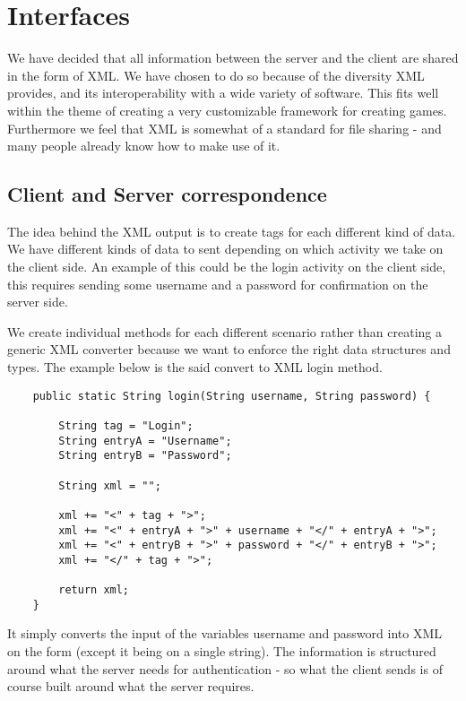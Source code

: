\section{Interfaces}

We have decided that all information between the server and the client are shared in the form of XML. We have chosen to do so because of the diversity XML provides, and its interoperability with a wide variety of software. This fits well within the theme of creating a very customizable framework for creating games. Furthermore we feel that XML is somewhat of a standard for file sharing - and many people already know how to make use of it.

\subsection{Client and Server correspondence}

The idea behind the XML output is to create tags for each different kind of data. We have different kinds of data to sent depending on which activity we take on the client side. An example of this could be the login activity on the client side, this requires sending some username and a password for confirmation on the server side.

We create individual methods for each different scenario rather than creating a generic XML converter because we want to enforce the right data structures and types. The example below is the said convert to XML login method. 

\begin{lstlisting}
    public static String login(String username, String password) {

        String tag = "Login";
        String entryA = "Username";
        String entryB = "Password";

        String xml = "";

        xml += "<" + tag + ">";
        xml += "<" + entryA + ">" + username + "</" + entryA + ">";
        xml += "<" + entryB + ">" + password + "</" + entryB + ">";
        xml += "</" + tag + ">";

        return xml;
    }
\end{lstlisting}

It simply converts the input of the variables username and password into XML on the form (except it being on a single string). The information is structured around what the server needs for authentication - so what the client sends is of course built around what the server requires.

